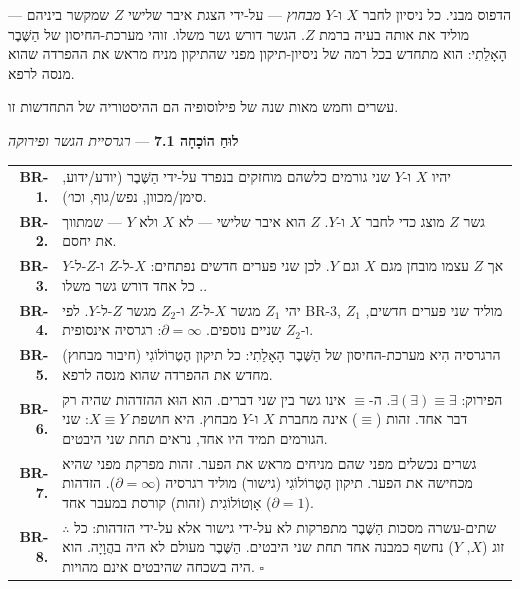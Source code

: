 \documentclass[10pt, openany, oneside]{book}
\renewcommand{\footnotesize}{\fontsize{8.5}{11}\selectfont}
\begin{document}
הדפוס מבני. כל ניסיון לחבר $X$ ו-$Y$ \textit{מבחוץ} — על-ידי הצגת איבר שלישי $Z$ שמקשר ביניהם — מוליד את אותה בעיה ברמת $Z$. הגשר דורש גשר משלו. זוהי מערכת-החיסון של הַשֶּׁבֶר הָאָלֵתִי: הוא מתחדש בכל רמה של ניסיון-תיקון מפני שהתיקון מניח מראש את ההפרדה שהוא מנסה לרפא.

עשרים וחמש מאות שנה של פילוסופיה הם ההיסטוריה של התחדשות זו.

\vspace{0.5em}

\textbf{לוּחַ הוֹכָחָה 7.1} --- \textit{רגרסיית הגשר ופירוקה}

\vspace{0.5em}

{\footnotesize
\noindent\begin{tabular}{r p{}}
\textbf{BR-1.} & יהיו $X$ ו-$Y$ שני גורמים כלשהם מוחזקים בנפרד על-ידי הַשֶּׁבֶר (יודע/ידוע, סימן/מכוון, נפש/גוף, וכו׳). \\[0.3em]
\textbf{BR-2.} & גשר $Z$ מוצג כדי לחבר $X$ ו-$Y$. $Z$ הוא איבר שלישי — לא $X$ ולא $Y$ — שמתווך את יחסם. \\[0.3em]
\textbf{BR-3.} & אך $Z$ עצמו מובחן מגם $X$ וגם $Y$. לכן שני פערים חדשים נפתחים: $X$-ל-$Z$ ו-$Z$-ל-$Y$. כל אחד דורש גשר משלו. \\[0.3em]
\textbf{BR-4.} & יהי $Z_1$ מגשר $X$-ל-$Z$ ו-$Z_2$ מגשר $Z$-ל-$Y$. לפי BR-3, $Z_1$ מוליד שני פערים חדשים, ו-$Z_2$ שניים נוספים. $\partial = \infty$: רגרסיה אינסופית. \\[0.3em]
\textbf{BR-5.} & הרגרסיה הִיא מערכת-החיסון של הַשֶּׁבֶר הָאָלֵתִי: כל תיקון הֶטֶרוֹלוֹגִי (חיבור מבחוץ) מחדש את ההפרדה שהוא מנסה לרפא. \\[0.3em]
\textbf{BR-6.} & הפירוק: $\exists(\exists) \equiv \exists$. ה-$\equiv$ אינו גשר בין שני דברים. הוא הוּא ההזדהות שהיה רק דבר אחד. זהות ($\equiv$) אינה מחברת $X$ ו-$Y$ מבחוץ. היא חושפת $X \equiv Y$: שני הגורמים תמיד היו אחד, נראים תחת שני היבטים. \\[0.3em]
\textbf{BR-7.} & גשרים נכשלים מפני שהם מניחים מראש את הפער. זהות מפרקת מפני שהיא מכחישה את הפער. תיקון הֶטֶרוֹלוֹגִי (גישור) מוליד רגרסיה ($\partial = \infty$). הזדהות אָוְטוֹלוֹגִית (זהות) קורסת במעבר אחד ($\partial = 1$). \\[0.3em]
\textbf{BR-8.} & $\therefore$ שתים-עשרה מסכות הַשֶּׁבֶר מתפרקות לא על-ידי גישור אלא על-ידי הזדהות: כל זוג ($X$, $Y$) נחשף כמבנה אחד תחת שני היבטים. הַשֶּׁבֶר מעולם לא היה בהֲוָיָה. הוא היה בשכחה שהיבטים אינם מהויות. $\square$ \\[0.3em]
\end{tabular}
}
\end{document}
